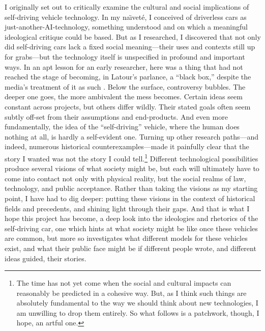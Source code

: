 I originally set out to critically examine the cultural and social
implications of self-driving vehicle technology. In my na\"{\i}vet\'{e}, I
conceived of driverless cars as just-another-AI-technology, something
understood and on which a meaningful ideological critique could be
based. But as I researched, I discovered that not only did
self-driving cars lack a fixed social meaning---their uses and
contexts still up for grabs---but the technology itself is unspecified
in profound and important ways. In an apt lesson for an early researcher,
here was a thing that had not reached the stage of becoming, in
Latour's parlance, a ``black box,'' despite the media's treatment of
it as such \cite{LatourScience}. Below the surface, controversy
bubbles. The deeper one 
goes, the more ambivalent the mess becomes. Certain ideas seem
constant across projects, but others differ wildly. Their stated goals
often seem subtly off-set from their assumptions and end-products. And
even more fundamentally, the idea of the ``self-driving'' vehicle,
where the human does nothing at all, is hardly a self-evident one.
Turning up other research paths---and indeed, numerous historical
counterexamples---made it painfully clear that the story I wanted was
not the story I could tell.\footnote{The time has not yet come when the social
and cultural impacts can reasonably be predicted in a cohesive way.
But, as I think such things are absolutely fundamental to the way we
should think about new technologies, I am unwilling to drop them
entirely. So what follows is a patchwork, though, I hope, an artful
one.} Different technological possibilities produce several visions of
what society might be, but each will ultimately have to come into
contact not only with physical reality, but the social realms of law,
technology, and public acceptance. Rather than taking the visions as
my starting point, I have had to dig deeper: putting these visions in the context of
historical fields and precedents, and shining light through their
gaps. And that is what I hope this project has become, a 
deep look into the ideologies and rhetorics of the self-driving car,
one which hints at what society might be like once these
vehicles are common, but more so investigates what different models for these vehicles
exist, and what their public face might be if different people wrote,
and different ideas guided, their stories.


